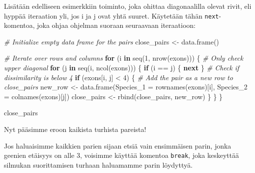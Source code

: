 \documentclass[
]{book}
\newenvironment{Shaded}{\begin{snugshade}}{\end{snugshade}}
\newcommand{\AttributeTok}[1]{\textcolor[rgb]{0.77,0.63,0.00}{#1}}
\newcommand{\CommentTok}[1]{\textcolor[rgb]{0.56,0.35,0.01}{\textit{#1}}}
\newcommand{\ControlFlowTok}[1]{\textcolor[rgb]{0.13,0.29,0.53}{\textbf{#1}}}
\newcommand{\DecValTok}[1]{\textcolor[rgb]{0.00,0.00,0.81}{#1}}
\newcommand{\FunctionTok}[1]{\textcolor[rgb]{0.00,0.00,0.00}{#1}}
\newcommand{\NormalTok}[1]{#1}
\newcommand{\OtherTok}[1]{\textcolor[rgb]{0.56,0.35,0.01}{#1}}
\newcommand{\SpecialCharTok}[1]{\textcolor[rgb]{0.00,0.00,0.00}{#1}}
\begin{document}
Lisätään edelliseen esimerkkiin toiminto, joka ohittaa diagonaalilla olevat rivit, eli hyppää iteraation yli, jos i ja j ovat yhtä suuret. Käytetään tähän \texttt{next}-komentoa, joka ohjaa ohjelman suoraan seuraavaan iteraatioon:

\begin{Shaded}
\begin{Highlighting}[]
\CommentTok{\# Initialize empty data frame for the pairs}
\NormalTok{close\_pairs }\OtherTok{\textless{}{-}} \FunctionTok{data.frame}\NormalTok{()}

\CommentTok{\# Iterate over rows and columns}
\ControlFlowTok{for}\NormalTok{ (i }\ControlFlowTok{in} \FunctionTok{seq}\NormalTok{(}\DecValTok{1}\NormalTok{, }\FunctionTok{nrow}\NormalTok{(exons))) \{}
  \CommentTok{\# Only check upper diagonal}
  \ControlFlowTok{for}\NormalTok{ (j }\ControlFlowTok{in} \FunctionTok{seq}\NormalTok{(i, }\FunctionTok{ncol}\NormalTok{(exons))) \{}
    \ControlFlowTok{if}\NormalTok{ (i }\SpecialCharTok{==}\NormalTok{ j) \{}
        \ControlFlowTok{next}
\NormalTok{    \}}
    \CommentTok{\# Check if dissimilarity is below 4}
    \ControlFlowTok{if}\NormalTok{ (exons[i, j] }\SpecialCharTok{\textless{}} \DecValTok{4}\NormalTok{) \{}
      \CommentTok{\# Add the pair as a new row to close\_pairs}
\NormalTok{      new\_row }\OtherTok{\textless{}{-}} \FunctionTok{data.frame}\NormalTok{(}\AttributeTok{Species\_1 =} \FunctionTok{rownames}\NormalTok{(exons)[i],}
                            \AttributeTok{Species\_2 =} \FunctionTok{colnames}\NormalTok{(exons)[j])}
\NormalTok{      close\_pairs }\OtherTok{\textless{}{-}} \FunctionTok{rbind}\NormalTok{(close\_pairs,}
\NormalTok{                           new\_row)}
\NormalTok{    \}}
\NormalTok{  \}}
\NormalTok{\}}

\NormalTok{close\_pairs}
\end{Highlighting}
\end{Shaded}

Nyt pääsimme eroon kaikista turhista pareista!

Jos haluaisimme kaikkien parien sijaan etsiä vain ensimmäisen parin, jonka geenien etäisyys on alle 3, voisimme käyttää komentoa \texttt{break}, joka keskeyttää silmukan suorittamisen turhaan haluamamme parin löydyttyä.
\end{document}
